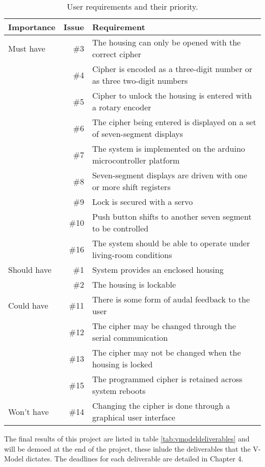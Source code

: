\begin{table}
\centering
\caption{User requirements and their priority.}
\begin{adjustwidth}{-1in}{1in}
\begin{tabular}{lrl}
\\
Importance & Issue & Requirement \\ \hline
\hline Must have
& \#3 & The housing can only be opened with the correct cipher \\
& \#4 & Cipher is encoded as a three-digit number or as three two-digit numbers \\
& \#5 & Cipher to unlock the housing is entered with a rotary encoder \\
& \#6 & The cipher being entered is displayed on a set of seven-segment displays \\
& \#7 & The system is implemented on the arduino microcontroller platform \\
& \#8 & Seven-segment displays are driven with one or more shift registers \\
& \#9 & Lock is secured with a servo \\
& \#10 & Push button shifts to another seven segment to be controlled \\
& \#16 & The system should be able to operate under living-room conditions \\
\hline Should have
& \#1 & System provides an enclosed housing \\
& \#2 & The housing is lockable \\
\hline Could have
& \#11 & There is some form of audal feedback to the user \\
& \#12 & The cipher may be changed through the serial communication \\
& \#13 & The cipher may not be changed when the housing is locked \\
& \#15 & The programmed cipher is retained across system reboots \\
\hline Won't have
& \#14 & Changing the cipher is done through a graphical user interface \\
\end{tabular}
\end{adjustwidth}
\label{tab:userrequirements}
\end{table}

The final results of this project are listed in table \ref{tab:vmodeldeliverables} and will be demoed at the end of the project, these inlude the deliverables that the V-Model dictates. The deadlines for each deliverable are detailed in Chapter 4.

